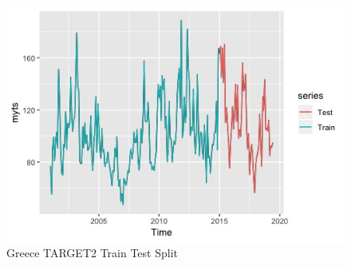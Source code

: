 \documentclass[12pt]{article}
\begin{document}
\begin{figure}
  \center
  \includegraphics[width=0.8\linewidth]{split.jpeg}
  \caption{Greece TARGET2 Train Test Split}
  \label{fig:split}
\end{figure}
\end{document}
